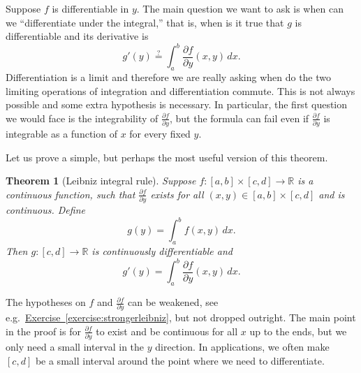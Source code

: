 \documentclass[12pt,openany]{book}
\newcommand{\R}{{\mathbb{R}}}
\newcommand{\myindex}[1]{#1\index{#1}}
\theoremstyle{plain}
\newtheorem{thm}{Theorem}[section]
\theoremstyle{remark}
\theoremstyle{definition}
\theoremstyle{exercise}
\theoremstyle{example}
\newcommand{\exerciseref}[1]{\hyperref[#1]{Exercise~\ref*{#1}}}
\begin{document}
Suppose $f$ is differentiable in $y$.  The main question we want to
ask is when can we ``differentiate under the integral,'' that is,
when is it true that $g$ is differentiable and its derivative is
\begin{equation*}
g'(y) \overset{?}{=} \int_a^b \frac{\partial f}{\partial y}(x,y) \,dx .
\end{equation*}
Differentiation is a limit and therefore we are really asking when do the
two limiting operations of integration and differentiation commute.
This is not always possible and some extra hypothesis is
necessary.  In particular, the first
question we would face is the integrability of
$\frac{\partial f}{\partial y}$, but the formula can fail even if
$\frac{\partial f}{\partial y}$ is integrable as a function of $x$ for every
fixed $y$.

Let us prove a simple, but perhaps the most useful version of this theorem.

\begin{thm}[\myindex{Leibniz integral rule}]
\label{thm:Leibnizrule}
Suppose $f \colon [a,b] \times [c,d] \to \R$ is a continuous function,
such that $\frac{\partial f}{\partial y}$ exists for all $(x,y) \in [a,b]
\times [c,d]$ and is continuous.  Define
\begin{equation*}
g(y) = \int_a^b f(x,y) \,dx .
\end{equation*}
Then $g \colon [c,d] \to \R$ is continuously differentiable and
\begin{equation*}
g'(y) = \int_a^b \frac{\partial f}{\partial y}(x,y) \,dx .
\end{equation*}
\end{thm}

The hypotheses on $f$ and $\frac{\partial f}{\partial y}$ can be
weakened, see e.g.\ \exerciseref{exercise:strongerleibniz},
but not dropped outright.
The main point in the proof is for
$\frac{\partial f}{\partial y}$ to exist and be continuous for all $x$
up to the ends, but we only need a small
interval in the $y$ direction.  In applications, we often make $[c,d]$ be a
small interval around the point where we need to differentiate.
\end{document}
